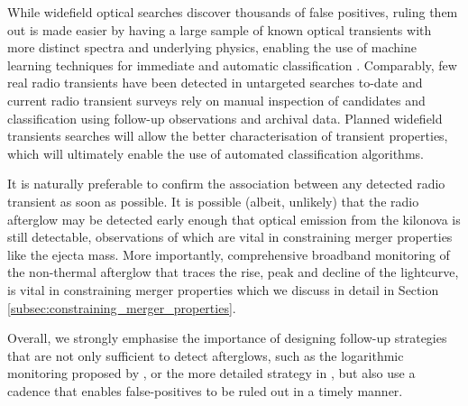 While widefield optical searches discover thousands of false positives, ruling them out is made easier by having a large sample of known optical transients with more distinct spectra and underlying physics, enabling the use of machine learning techniques for immediate and automatic classification \citep[e.g.][]{2008AN....329..288M,2012PASP..124.1175B,2015AJ....150...82G,2019PASP..131c8002M,2020MNRAS.tmp.1941S}. Comparably, few real radio transients have been detected in untargeted searches to-date \citep{2016MNRAS.456.2321S,2018ApJ...866L..22L} and current radio transient surveys rely on manual inspection of candidates and classification using follow-up observations and archival data. Planned widefield transients searches will allow the better characterisation of transient properties, which will ultimately enable the use of automated classification algorithms.

It is naturally preferable to confirm the association between any detected radio transient as soon as possible. It is possible (albeit, unlikely) that the radio afterglow may be detected early enough that optical emission from the kilonova is still detectable, observations of which are vital in constraining merger properties like the ejecta mass. More importantly, comprehensive broadband monitoring of the non-thermal afterglow that traces the rise, peak and decline of the lightcurve, is vital in constraining merger properties which we discuss in detail in Section \ref{subsec:constraining_merger_properties}.

Overall, we strongly emphasise the importance of designing follow-up strategies that are not only sufficient to detect afterglows, such as the logarithmic monitoring proposed by \citet{2016ApJ...831..190H}, or the more detailed strategy in \citet{2018ApJ...867..135C}, but also use a cadence that enables false-positives to be ruled out in a timely manner.

